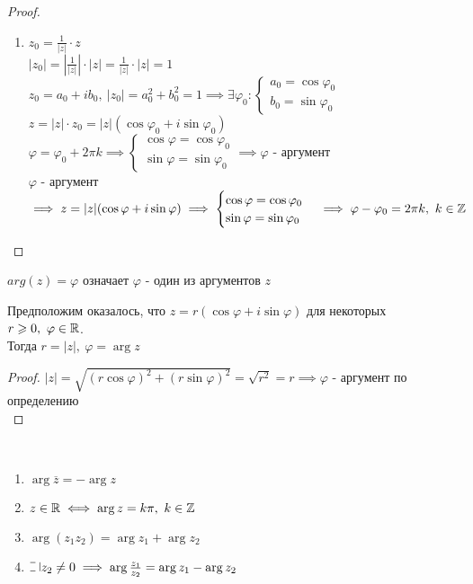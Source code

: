 \begin{normalsize}
\begin{proof}
\begin{enumerate}
        \item $z_0 = \frac{1}{|z|} \cdot z$ \\
        $|z_0| = \left| \frac{1}{|z|} \right| \cdot |z| = \frac{1}{|z|} \cdot |z| = 1$\\
        $z_0 = a_0 + ib_0,~|z_0| = a_0^2 + b_0^2 = 1 \implies \exists \varphi_0:
        \begin{cases}
            a_0 = \cos\varphi_0\\
            b_0 = \sin\varphi_0
        \end{cases}$\\
        $z = |z| \cdot z_0 = |z|(\cos\varphi_0 + i\sin\varphi_0)$\\
        $\varphi = \varphi_0 + 2 \pi k \implies
        \begin{cases}
            \cos\varphi = \cos\varphi_0\\
            \sin\varphi = \sin\varphi_0
        \end{cases} \implies \varphi$ - аргумент\\
        $\varphi$ - аргумент $\implies z = |z|(\cos\varphi + i\sin\varphi) \implies
        \begin{cases}
            \cos\varphi = \cos\varphi_0\\
            \sin\varphi = \sin\varphi_0
        \end{cases} \implies \varphi - \varphi_0 = 2 \pi k,~k \in \mathbb{Z}$
    
    \end{enumerate}
\end{proof}

\begin{defn}
    $arg(z) = \varphi$ означает $\varphi$ - один из аргументов $z$
\end{defn}

\begin{notice}
    Предположим оказалось, что $z = r(\cos\varphi + i\sin\varphi)$ для некоторых $r \geqslant 0,~\varphi \in \mathbb{R}$.\\
    Тогда $r = |z|,~\varphi = \arg z$
\end{notice}

\begin{proof}
    $|z| = \sqrt{(r\cos\varphi)^2 + (r\sin\varphi)^2} = \sqrt{r^2} = r \implies \varphi$ - аргумент по определению\\
\end{proof}

\begin{theorem-non}~
    \begin{enumerate}
        \item $\arg \overline{z} = -\arg z$
        \item $z \in \mathbb{R} \iff \arg z = k \pi,~k \in \mathbb{Z}$
        \item $\arg(z_1 z_2) = \arg z_1 + \arg z_2$
        \item $\letus z_2 \neq 0 \implies \arg \frac{z_1}{z_2} = \arg z_1 - \arg z_2$
    \end{enumerate}
\end{theorem-non}


\end{normalsize}
